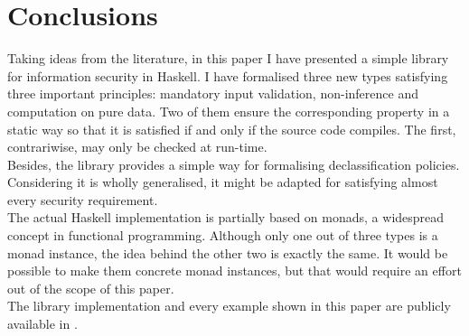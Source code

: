 \section{Conclusions}\label{sec:conclusion}
Taking ideas from the literature, in this paper I have presented a simple library for information security in Haskell. I have formalised three new types satisfying three important principles: mandatory input validation, non-inference and computation on pure data. Two of them ensure the corresponding property in a static way so that it is satisfied if and only if the source code compiles. The first, contrariwise, may only be checked at run-time. \\
Besides, the library provides a simple way for formalising declassification policies. Considering it is wholly generalised, it might be adapted for satisfying almost every security requirement. \\
The actual Haskell implementation is partially based on monads, a widespread concept in functional programming. Although only one out of three types is a monad instance, the idea behind the other two is exactly the same. It would be possible to make them concrete monad instances, but that would require an effort out of the scope of this paper. \\
The library implementation and every example shown in this paper are publicly available in \cite{mdipirroGitHub}. 